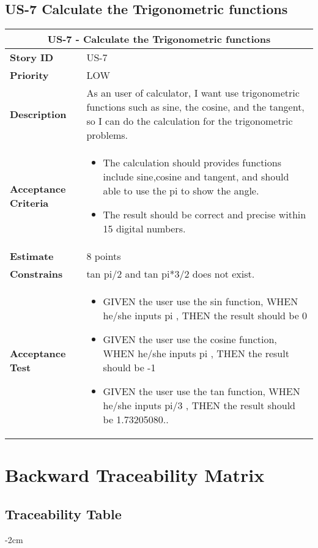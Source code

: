 \documentclass[12pt]{report}
\begin{document}
{\section{US-7 Calculate the Trigonometric functions}
\begin{tabular}{ |p{4cm}|p{11cm}| }
 \hline
 \multicolumn{2}{|c|}{US-7 - Calculate the Trigonometric functions} \\
 \hline
 \textbf {Story ID}& US-7 \\
 \hline
 \textbf{Priority} & LOW \\
 \hline
  \textbf{Description}   & As an user of calculator, I want use trigonometric functions such as sine, the cosine, and the tangent, so I can do the calculation for the trigonometric problems.
  \\
  \hline
  \textbf{Acceptance Criteria}&
     \begin{itemize}
     \item  The calculation should provides functions include sine,cosine and tangent, and should able to use the pi to show the angle.
     \item  The result should be correct and precise within 15 digital numbers.
\end{itemize}
  \\
 \hline
 \textbf{Estimate} & 8 points\\
 \hline
 \textbf{Constrains}& tan pi/2 and tan pi*3/2 does not exist. \\
 \hline
   \textbf{Acceptance Test}&
     \begin{itemize}
     \item  GIVEN the user use the sin function, WHEN he/she inputs pi , THEN the result should be 0
      \item  GIVEN the user use the cosine function, WHEN he/she inputs pi , THEN the result should be -1
     \item  GIVEN the user use the tan function, WHEN he/she inputs pi/3 , THEN the result should be 1.73205080..
\end{itemize}
  \\
 \hline
\end{tabular}

\chapter{Backward Traceability Matrix } 

\section{Traceability Table}
\begin{table}[!ht]
\centering
\addtolength{\leftskip} {-2cm}
\addtolength{\rightskip}{-2cm}


\end{table}}
\end{document}
